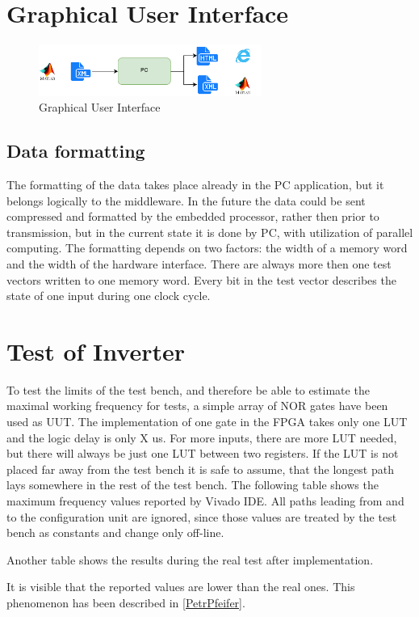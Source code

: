 \section{Graphical User Interface}

\begin{figure}[h]
\centering
\includegraphics[width=0.65\textwidth]{figures/PC.png}
\caption{Graphical User Interface}
\label{fig:gui}
\end{figure}

\subsection{Data formatting}
The formatting of the data takes place already in the PC application, but it belongs logically to the middleware. In the future the data could be sent compressed and formatted by the embedded processor, rather then prior to transmission, but in the current state it is done by PC, with utilization of parallel computing. The formatting depends on two factors: the width of a memory word and the width of the hardware interface. There are always more then one test vectors written to one memory word. Every bit in the test vector describes the state of one input during one clock cycle.

\section{Test of Inverter}
To test the limits of the test bench, and therefore be able to estimate the maximal working frequency for tests, a simple array of NOR gates have been used as UUT. The implementation of one gate in the FPGA takes only one LUT and the logic delay is only X us. For more inputs, there are more LUT needed, but there will always be just one LUT between two registers. If the LUT is not placed far away from the test bench it is safe to assume, that the longest path lays somewhere in the rest of the test bench. The following table shows the maximum frequency values reported by Vivado IDE. All paths leading from and to the configuration unit are ignored, since those values are treated by the test bench as constants and change only off-line.

Another table shows the results during the real test after implementation.

It is visible that the reported values are lower than the real ones. This phenomenon has been described in \ref{PetrPfeifer}.


